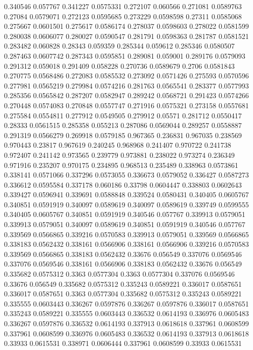 0.340546 0.057767
0.341227 0.0575331
0.272107 0.060566
0.271081 0.0589763
0.27084 0.0579071
0.272123 0.0595685
0.273229 0.0598598
0.27311 0.0585068
0.275667 0.0601501
0.275617 0.0586174
0.278037 0.0598603
0.278022 0.0581599
0.280038 0.0606077
0.280027 0.0590547
0.281791 0.0598363
0.281787 0.0581521
0.283482 0.060828
0.28343 0.059359
0.285344 0.059612
0.285346 0.0580507
0.287463 0.0607742
0.287343 0.0595851
0.289081 0.059001
0.289176 0.0579093
0.291312 0.059018
0.291409 0.058228
0.270736 0.0589679
0.2706 0.0581843
0.270775 0.0568486
0.272083 0.0585532
0.273092 0.0571426
0.275593 0.0570596
0.277981 0.0565219
0.279984 0.0574216
0.281763 0.0565541
0.283377 0.0577993
0.285356 0.0565842
0.287207 0.0582947
0.289242 0.0568721
0.291423 0.0574266
0.270448 0.0574083
0.270848 0.0557747
0.271916 0.0575321
0.273158 0.0557681
0.275584 0.0554811
0.277912 0.0549505
0.279912 0.05571
0.281712 0.0550417
0.28333 0.0561515
0.285358 0.055213
0.287086 0.0569044
0.289257 0.0558887
0.291319 0.0566279
0.269918 0.0579185
0.967365 0.236831
0.967035 0.238569
0.970443 0.23817
0.967619 0.240245
0.968968 0.241407
0.970722 0.241738
0.972407 0.241142
0.973565 0.239779
0.973881 0.238022
0.973274 0.236349
0.971916 0.235207
0.970175 0.234895
0.968513 0.235489
0.338963 0.0573861
0.338141 0.0571066
0.337296 0.0573055
0.336673 0.0579052
0.336427 0.0587273
0.336612 0.0595584
0.337178 0.060186
0.33798 0.0604447
0.338803 0.0602643
0.339427 0.0596941
0.339691 0.0588848
0.339524 0.0580431
0.340405 0.0605767
0.340851 0.0591919
0.340097 0.0589619
0.340097 0.0589619
0.339749 0.0599555
0.340405 0.0605767
0.340851 0.0591919
0.340546 0.057767
0.339913 0.0579051
0.339913 0.0579051
0.340097 0.0589619
0.340851 0.0591919
0.340546 0.057767
0.339569 0.0566865
0.339216 0.0570583
0.339913 0.0579051
0.339569 0.0566865
0.338183 0.0562432
0.338161 0.0566906
0.338161 0.0566906
0.339216 0.0570583
0.339569 0.0566865
0.338183 0.0562432
0.33676 0.056549
0.337076 0.0569546
0.337076 0.0569546
0.338161 0.0566906
0.338183 0.0562432
0.33676 0.056549
0.335682 0.0575312
0.3363 0.0577304
0.3363 0.0577304
0.337076 0.0569546
0.33676 0.056549
0.335682 0.0575312
0.335243 0.0589221
0.336017 0.0587651
0.336017 0.0587651
0.3363 0.0577304
0.335682 0.0575312
0.335243 0.0589221
0.335555 0.0603443
0.336267 0.0597876
0.336267 0.0597876
0.336017 0.0587651
0.335243 0.0589221
0.335555 0.0603443
0.336532 0.0614193
0.336976 0.0605483
0.336267 0.0597876
0.336532 0.0614193
0.337913 0.0618618
0.337961 0.0608599
0.337961 0.0608599
0.336976 0.0605483
0.336532 0.0614193
0.337913 0.0618618
0.33933 0.0615531
0.338971 0.0606444
0.337961 0.0608599
0.33933 0.0615531
